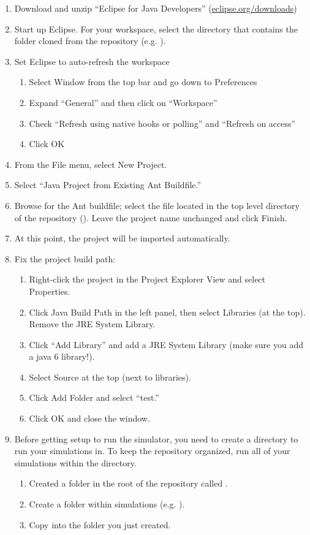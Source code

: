 \documentclass[11pt]{article}
\begin{document}
\begin{enumerate}
\item Download and unzip ``Eclipse for Java Developers'' (\href{http://www.eclipse.org/downloads/}{eclipse.org/downloads})
\item Start up Eclipse. For your workspace, select the directory that contains
  the  folder cloned from the repository (e.g. ).
\item Set Eclipse to auto-refresh the workspace
  \begin{enumerate}
  \item Select Window from the top bar and go down to Preferences
  \item Expand ``General'' and then click on ``Workspace''
  \item Check ``Refresh using native hooks or polling'' and ``Refresh on access''
  \item Click OK
  \end{enumerate}
  
\item From the File menu, select New Project.
\item Select ``Java Project from Existing Ant Buildfile.''
\item Browse for the Ant buildfile; select the  file located in
  the top level directory of the repository
  (). Leave the project name unchanged and
  click Finish.
\item At this point, the project will be imported automatically.
\item Fix the project build path:
  \begin{enumerate}
  \item Right-click the project in the Project Explorer View and select
    Properties.
  \item Click Java Build Path in the left panel, then select Libraries (at the
    top). Remove the JRE System Library.
  \item Click ``Add Library'' and add a JRE System Library (make sure you add a
    java 6 library!).
  \item Select Source at the top (next to libraries).
  \item Click Add Folder and select ``test.''
  \item Click OK and close the window.
  \end{enumerate}

\item Before getting setup to run the simulator, you need to create a directory
  to run your simulations in.  To keep the repository organized, run all of your
  simulations within the  directory.
  \begin{enumerate}
  \item Created a folder in the root of the repository called .
  \item Create a folder within simulations (e.g. ).
  \item Copy  into the folder you just created.
  \end{enumerate}


\end{enumerate}
\end{document}
